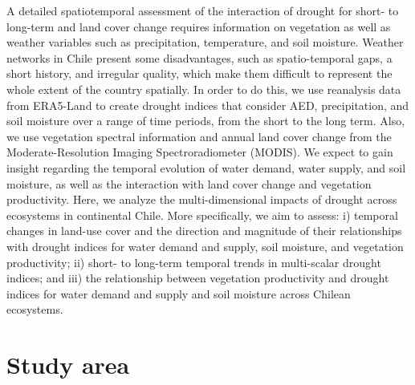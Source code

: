 \documentclass[
  authoryear,
  preprint,
  3p,
  onecolumn]{elsarticle}
\begin{document}
A detailed spatiotemporal assessment of the interaction of drought for
short- to long-term and land cover change requires information on
vegetation as well as weather variables such as precipitation,
temperature, and soil moisture. Weather networks in Chile present some
disadvantages, such as spatio-temporal gaps, a short history, and
irregular quality, which make them difficult to represent the whole
extent of the country spatially. In order to do this, we use reanalysis
data from ERA5-Land \citep{MunozSabater2021} to create drought indices
that consider AED, precipitation, and soil moisture over a range of time
periods, from the short to the long term. Also, we use vegetation
spectral information and annual land cover change from the
Moderate-Resolution Imaging Spectroradiometer (MODIS). We expect to gain
insight regarding the temporal evolution of water demand, water supply,
and soil moisture, as well as the interaction with land cover change and
vegetation productivity. Here, we analyze the multi-dimensional impacts
of drought across ecosystems in continental Chile. More specifically, we
aim to assess: i) temporal changes in land-use cover and the direction
and magnitude of their relationships with drought indices for water
demand and supply, soil moisture, and vegetation productivity; ii)
short- to long-term temporal trends in multi-scalar drought indices; and
iii) the relationship between vegetation productivity and drought
indices for water demand and supply and soil moisture across Chilean
ecosystems.

\hypertarget{study-area}{%
\section{Study area}\label{study-area}}
\end{document}

